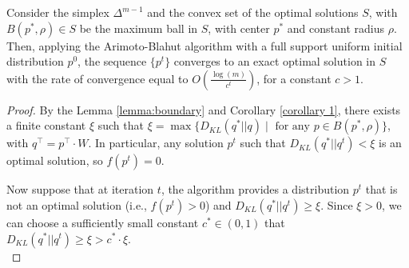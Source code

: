 \documentclass[10pt,a4paper]{amsart}
\begin{document}
\begin{theorem}\label{thm: converge to exact solution in the interior}
Consider the simplex $\Delta^{m-1}$ and the convex set of the optimal solutions $S$, with $B(p^*, \rho) \in S$ be the maximum ball in $S$, with center $p^*$ and constant radius $\rho$. Then, applying the Arimoto-Blahut algorithm with a full support uniform initial distribution $p^0$, the sequence $\{p^t\}$ converges to an exact optimal solution in $S$ with the rate of convergence equal to $O\left(\frac{\log(m)}{c^t} \right)$, for a constant $c > 1$. 
\end{theorem}

\begin{proof}
By the Lemma \ref{lemma:boundary} and Corollary \ref{corollary 1}, there exists a finite constant $\xi$ such that 
$\xi = \max \{D_{KL}(q^*|| q) \mid \text{ for any }p \in B(p^*, \rho)\}$, with $q^{\top} = p^{\top}\cdot W$. In particular, any solution $p^t$ such that $D_{KL}(q^*|| q^t) <  \xi$ is an optimal solution, so $f(p^t) = 0$. 

Now suppose that at iteration $t$, the algorithm provides a distribution $p^t$ that is not an optimal solution (i.e., $f(p^t) > 0$) and $D_{KL}(q^*|| q^t) \geq \xi$. Since $\xi > 0$, we can choose a sufficiently small constant $c^* \in (0,1)$ that $D_{KL}(q^*|| q^t) \geq \xi > c^* \cdot \xi$. \\



\end{proof}
\end{document}
